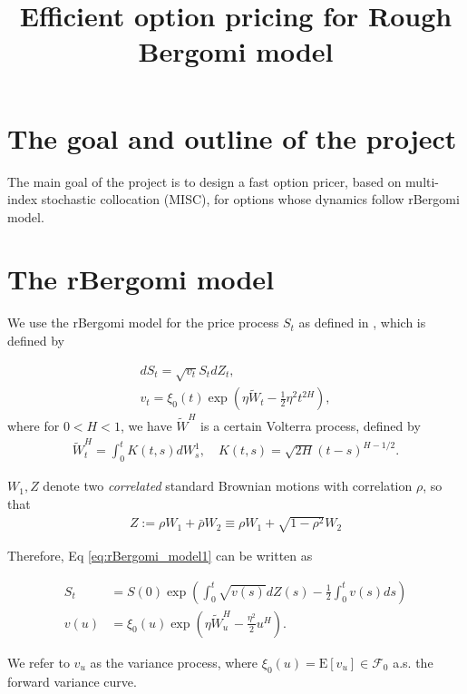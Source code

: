 \documentclass[11pt]{article}
\title{Efficient option pricing for Rough Bergomi model}
\date{ }
\newcommand{\expt}[1]{\mathrm{E}\left[#1\right]}
\begin{document}
\maketitle


\section{The goal and outline of the project}
The main goal of the project is to design a fast option pricer, based on multi-index stochastic collocation (MISC), for options whose dynamics follow rBergomi model.
\section{The rBergomi model}\label{sec:The rBergomi model}

We use  the rBergomi model for the price process $S_t$ as defined in  \cite{bayer2016pricing}, which is defined by

\begin{align}\label{eq:rBergomi_model1}
	dS_t = \sqrt{v_t} S_t dZ_t,\\
	v_t = \xi_0(t) \exp\left( \eta \tilde{W}_t - \frac{1}{2} \eta^2 t^{2H} \right),
\end{align}
where for $0 < H < 1$,  we have $\tilde{W}^H $ is a certain Volterra process,  defined by
\begin{align}
	\tilde{W}_t^H = \int_0^t K(t,s) dW_s^1, \quad K(t,s) = \sqrt{2H} (t-s)^{H - 1/2}.
\end{align}


$W_1, Z$ denote two \emph{correlated} standard Brownian motions with correlation $\rho$, so that
\begin{align}
	Z:=\rho	W_1+ \bar{\rho}W_2 \equiv \rho W_1+\sqrt{1-\rho^2} W_2
\end{align}

Therefore, Eq \ref{eq:rBergomi_model1} can be written as 

\begin{align}\label{eq:rBergomi_model}
	S_t&= S(0)  \operatorname{exp}\left( \int_{0}^{t} \sqrt{v(s)} dZ(s)- \frac{1}{2} \int_{0}^{t} v(s) ds   \right)     \nonumber\\
	v(u)&=\xi_0(u) \operatorname{exp}\left( \eta \tilde{W}_u^H- \frac{\eta^2}{2} u^H \right) .
\end{align}

We refer to $v_u$ as the variance process, where $\xi_0(u) = \expt{v_u} \in \mathcal{F}_0$ a.s. the forward variance curve. 
\end{document}
